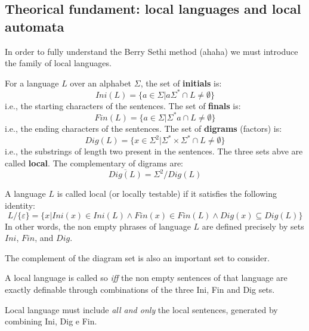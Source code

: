 		\subsection{Theorical fundament: local languages and local automata}
			In order to fully understand the Berry Sethi method (ahaha) we must introduce the family of local languages.
			\begin{definition}
				For a language $L$ over an alphabet $\Sigma$, the set of \textbf{initials} is:
				$$Ini(L)=\lbrace a\in\Sigma\vert a\Sigma^*\cap L\neq\emptyset\rbrace$$
				i.e., the starting characters of the sentences. The set of \textbf{finals} is:
				$$Fin(L)=\lbrace a\in\Sigma\vert \Sigma^* a\cap L\neq\emptyset\rbrace$$
				i.e., the ending characters of the sentences. The set of \textbf{digrams} (factors) is:
				$$Dig(L)=\lbrace x\in\Sigma^2\vert\Sigma^*\times\Sigma^*\cap L\neq\emptyset\rbrace$$
				i.e., the substrings of length two present in the sentences. The three sets abve are called \textbf{local}.
				The complementary of digrams are:
				$$\overline{Dig(L)}=\Sigma^2/Dig(L)$$
			\end{definition}

			\begin{definition}
				A language $L$ is called local (or locally testable) if it satisfies the following identity:
				$$L/\lbrace\varepsilon\rbrace =\lbrace x\vert Ini(x)\in Ini(L)\wedge Fin(x)\in Fin(L)\wedge Dig(x)\subseteq Dig(L)\rbrace$$
				In other words, the non empty phrases of language $L$ are defined precisely by sets $Ini$, $Fin$, and $Dig$.
			\end{definition}


			The complement of the diagram set is also an important set to consider.\\
			\begin{corollary}
				A local language is called so \emph{iff} the non empty sentences of that language are exactly definable through combinations of the three Ini, 
				Fin and Dig sets.
			\end{corollary}
			\begin{corollary}
				Local language must include \emph{all and only} the local sentences, generated by combining Ini, Dig e Fin.
			\end{corollary}

